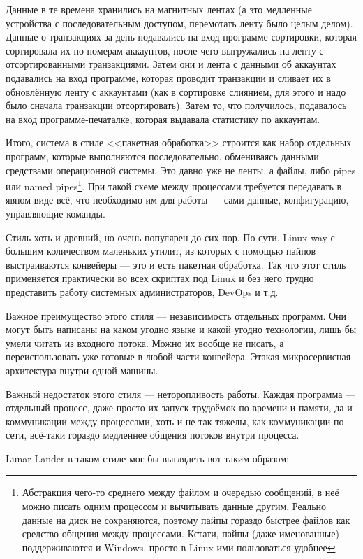 \documentclass[a5paper]{article}
\begin{document}
Данные в те времена хранились на магнитных лентах (а это медленные устройства с последовательным доступом, перемотать ленту было целым делом). Данные о транзакциях за день подавались на вход программе сортировки, которая сортировала их по номерам аккаунтов, после чего выгружались на ленту с отсортированными транзакциями. Затем они и лента с данными об аккаунтах подавались на вход программе, которая проводит транзакции и сливает их в обновлённую ленту с аккаунтами (как в сортировке слиянием, для этого и надо было сначала транзакции отсортировать). Затем то, что получилось, подавалось на вход программе-печаталке, которая выдавала статистику по аккаунтам.

Итого, система в стиле <<пакетная обработка>> строится как набор отдельных программ, которые выполняются последовательно, обмениваясь данными средствами операционной системы. Это давно уже не ленты, а файлы, либо pipes или named pipes\footnote{Абстракция чего-то среднего между файлом и очередью сообщений, в неё можно писать одним процессом и вычитывать данные другим. Реально данные на диск не сохраняются, поэтому пайпы гораздо быстрее файлов как средство общения между процессами. Кстати, пайпы (даже именованные) поддерживаются и Windows, просто в Linux ими пользоваться удобнее}. При такой схеме между процессами требуется передавать в явном виде всё, что необходимо им для работы --- сами данные, конфигурацию, управляющие команды.

Стиль хоть и древний, но очень популярен до сих пор. По сути, Linux way с большим количеством маленьких утилит, из которых с помощью пайпов выстраиваются конвейеры --- это и есть пакетная обработка. Так что этот стиль применяется практически во всех скриптах под Linux и без него трудно представить работу системных администраторов, DevOps и т.д.

Важное преимущество этого стиля --- независимость отдельных программ. Они могут быть написаны на каком угодно языке и какой угодно технологии, лишь бы умели читать из входного потока. Можно их вообще не писать, а переиспользовать уже готовые в любой части конвейера. Этакая микросервисная архитектура внутри одной машины.

Важный недостаток этого стиля --- неторопливость работы. Каждая программа --- отдельный процесс, даже просто их запуск трудоёмок по времени и памяти, да и коммуникации между процессами, хоть и не так тяжелы, как коммуникации по сети, всё-таки гораздо медленнее общения потоков внутри процесса.

Lunar Lander в таком стиле мог бы выглядеть вот таким образом:
\end{document}
